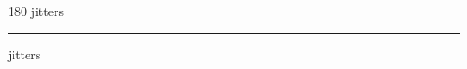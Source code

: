 
\begin{frame}
\begin{center}
\begin{turn}{180}
{\fontsize{2.5cm}{1em}\selectfont jitters}
\end{turn}
\vspace{1em}\par  
\hrule
\vspace{1em}\par  
{\fontsize{2.5cm}{1em}\selectfont jitters}
\end{center}
\end{frame}
